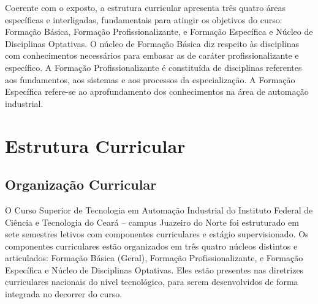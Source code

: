 Coerente com o exposto, a estrutura curricular apresenta três quatro áreas específicas e interligadas, fundamentais para atingir os objetivos do curso: Formação Básica, Formação Profissionalizante, e Formação Específica e Núcleo de Disciplinas Optativas. O núcleo de Formação Básica diz respeito às disciplinas com conhecimentos necessários para embasar as de caráter profissionalizante e específico. A Formação Profissionalizante é constituída de disciplinas referentes aos fundamentos, aos sistemas e aos processos da especialização. A Formação Específica refere-se ao aprofundamento dos conhecimentos na área de automação industrial.\\

\chapter{Estrutura Curricular}

\section{Organização Curricular}

O Curso Superior de Tecnologia em Automação Industrial do Instituto Federal de Ciência e Tecnologia do Ceará – campus Juazeiro do Norte foi estruturado em sete semestres letivos com componentes curriculares e estágio supervisionado. Os componentes curriculares estão organizados em três quatro núcleos distintos e articulados: Formação Básica (Geral), Formação Profissionalizante, e Formação Específica e Núcleo de Disciplinas Optativas. Eles estão presentes nas diretrizes curriculares nacionais do nível tecnológico, para serem desenvolvidos de forma integrada no decorrer do curso.\\






%
%		


